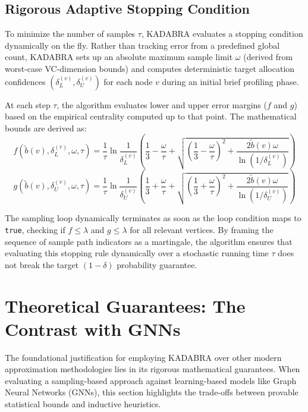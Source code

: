 \subsection{Rigorous Adaptive Stopping Condition}
To minimize the number of samples $\tau$, KADABRA evaluates a stopping condition dynamically on the fly.
 Rather than tracking error from a predefined global count,
  KADABRA sets up an absolute maximum sample limit $\omega$ (derived from worst-case VC-dimension bounds) and computes deterministic target
   allocation confidences $(\delta_L^{(v)}, \delta_U^{(v)})$ for each node $v$ during an initial brief profiling phase.

At each step $\tau$, the algorithm evaluates lower and upper error margins ($f$ and $g$) based on the empirical centrality computed up to that point.
 The mathematical bounds are derived as:
\begin{equation}
f(\tilde{b}(v), \delta_L^{(v)}, \omega, \tau) = \frac{1}{\tau}\ln\frac{1}{\delta_L^{(v)}}\left(\frac{1}{3} - \frac{\omega}{\tau} + \sqrt{\left(\frac{1}{3} - \frac{\omega}{\tau}\right)^2 + \frac{2\tilde{b}(v)\omega}{\ln(1/\delta_L^{(v)})}}\right)
\end{equation}
\begin{equation}
g(\tilde{b}(v), \delta_U^{(v)}, \omega, \tau) = \frac{1}{\tau}\ln\frac{1}{\delta_U^{(v)}}\left(\frac{1}{3} + \frac{\omega}{\tau} + \sqrt{\left(\frac{1}{3} + \frac{\omega}{\tau}\right)^2 + \frac{2\tilde{b}(v)\omega}{\ln(1/\delta_U^{(v)})}}\right)
\end{equation}

The sampling loop dynamically terminates as soon as the loop condition maps to \texttt{true},
 checking if $f \le \lambda$ and $g \le \lambda$ for all relevant vertices. By framing the sequence of sample path indicators as a martingale,
  the algorithm ensures that evaluating this stopping rule dynamically over a stochastic running time $\tau$ does not break the target $(1-\delta)$ probability guarantee.

\section{Theoretical Guarantees: The Contrast with GNNs}

The foundational justification for employing KADABRA over other modern approximation methodologies lies in its rigorous mathematical guarantees. When evaluating a sampling-based approach against learning-based models like Graph Neural Networks (GNNs), this section highlights the trade-offs between provable statistical bounds and inductive heuristics.

